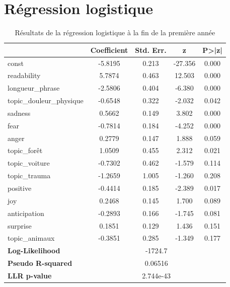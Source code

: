 \documentclass[12pt,a4paper,oneside,titlepage]{book} %
\begin{document}
\section*{Régression logistique}
\begin{table}[htbp]
	\centering
	\caption{Résultats de la régression logistique à la fin de la première année}
	\begin{tabular}{lcccc}
		\toprule
		& \textbf{Coefficient} & \textbf{Std. Err.} & \textbf{z} & \textbf{P>|z|} \\
		\midrule
		const                        & -5.8195 & 0.213 & -27.356 & 0.000 \\
		readability & 5.7874  & 0.463 & 12.503  & 0.000 \\
		longueur\_phrase             & -2.5806 & 0.404 & -6.380  & 0.000 \\
		topic\_douleur\_physique                     & -0.6548 & 0.322 & -2.032  & 0.042 \\
		sadness                      & 0.5662  & 0.149 & 3.802   & 0.000 \\
		fear                         & -0.7814 & 0.184 & -4.252  & 0.000 \\
		anger                        & 0.2779  & 0.147 & 1.888   & 0.059 \\
		topic\_forêt                     & 1.0509  & 0.455 & 2.312   & 0.021 \\
		topic\_voiture                   & -0.7302 & 0.462 & -1.579  & 0.114 \\
		topic\_trauma                 & -1.2659 & 1.005 & -1.260  & 0.208 \\
		positive                     & -0.4414 & 0.185 & -2.389  & 0.017 \\
		joy                          & 0.2468  & 0.145 & 1.700   & 0.089 \\
		anticipation                 & -0.2893 & 0.166 & -1.745  & 0.081 \\
		surprise                     & 0.1851  & 0.129 & 1.436   & 0.151 \\
		topic\_animaux                     & -0.3851 & 0.285 & -1.349  & 0.177 \\
		\midrule
		\textbf{Log-Likelihood}      & \multicolumn{4}{c}{-1724.7} \\
		\textbf{Pseudo R-squared}    & \multicolumn{4}{c}{0.06516} \\
		\textbf{LLR p-value}         & \multicolumn{4}{c}{2.744e-43} \\
		\bottomrule
	\end{tabular}
	\label{table:logit_prem_année}
\end{table}





			\pagebreak
			\nocite{*}
	\printbibliography
\end{document}
